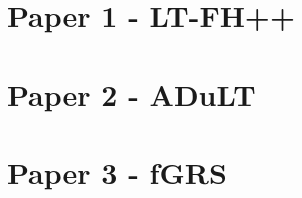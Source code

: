 
\section{Paper 1 - LT-FH++}

\newpage



\section{Paper 2 - ADuLT}

\newpage


\section{Paper 3 - fGRS}

\newpage
